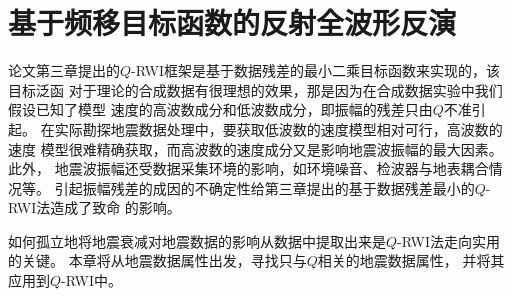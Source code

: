 
\chapter{基于频移目标函数的反射全波形反演}

论文第三章提出的$Q$-RWI框架是基于数据残差的最小二乘目标函数来实现的，该目标泛函
对于理论的合成数据有很理想的效果，那是因为在合成数据实验中我们假设已知了模型
速度的高波数成分和低波数成分，即振幅的残差只由$Q$不准引起。
在实际勘探地震数据处理中，要获取低波数的速度模型相对可行，高波数的速度
模型很难精确获取，而高波数的速度成分又是影响地震波振幅的最大因素。此外，
地震波振幅还受数据采集环境的影响，如环境噪音、检波器与地表耦合情况等。
引起振幅残差的成因的不确定性给第三章提出的基于数据残差最小的$Q$-RWI法造成了致命
的影响。

如何孤立地将地震衰减对地震数据的影响从数据中提取出来是$Q$-RWI法走向实用的关键。
本章将从地震数据属性出发，寻找只与$Q$相关的地震数据属性，
并将其应用到$Q$-RWI中。


\vspace{0.5cm}
